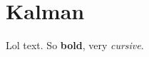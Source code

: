 \documentclass[Main]{subfiles}
\begin{document}
\section{Kalman} %
	\label{sec:kalman}

	Lol text.
	So \textbf{bold}, very \emph{cursive}.

\end{document}
